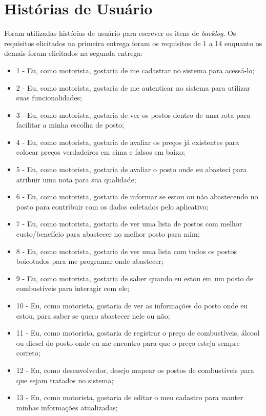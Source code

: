 \section{Histórias de Usuário}

Foram utilizadas histórias de usuário para escrever os itens de \textit{backlog}. Os requisitos elicitados na primeira entrega foram os requisitos de 1 a 14 enquanto os demais foram elicitados na segunda entrega:
\begin{itemize}
    \item 1 - Eu, como motorista, gostaria de me cadastrar no sistema para acessá-lo;
    \item 2 - Eu, como motorista, gostaria de me autenticar no sistema para utilizar suas funcionalidades;
    \item 3 - Eu, como motorista, gostaria de ver os postos dentro de uma rota para facilitar a minha escolha de posto;
    \item 4 - Eu, como motorista, gostaria de avaliar os preços já existentes para colocar preços verdadeiros em cima e falsos em baixo;
    \item 5 - Eu, como motorista, gostaria de avaliar o posto onde eu abasteci para atribuir uma nota para sua qualidade;
    \item 6 - Eu, como motorista, gostaria de informar se estou ou não abastecendo no posto para contribuir com os dados coletados pelo aplicativo;
    \item 7 - Eu, como motorista, gostaria de ver uma lista de postos com melhor custo/benefício para abastecer no melhor posto para mim;
    \item 8 - Eu, como motorista, gostaria de ver uma lista com todos os postos boicotados para me programar onde abastecer;
    \item 9 - Eu, como motorista, gostaria de saber quando eu estou em um posto de combustíveis para interagir com ele;
    \item 10 - Eu, como motorista, gostaria de ver as informações do posto onde eu estou, para saber se quero abastecer nele ou não;
    \item 11 - Eu, como motorista, gostaria de registrar o preço de combustíveis, álcool ou diesel do posto onde eu me encontro para que o preço esteja sempre correto;
    \item 12 - Eu, como desenvolvedor, desejo mapear os postos de combustíveis para que sejam tratados no sistema;
    \item 13 - Eu, como motorista, gostaria de editar o meu cadastro para manter minhas informações atualizadas;

\end{itemize}
